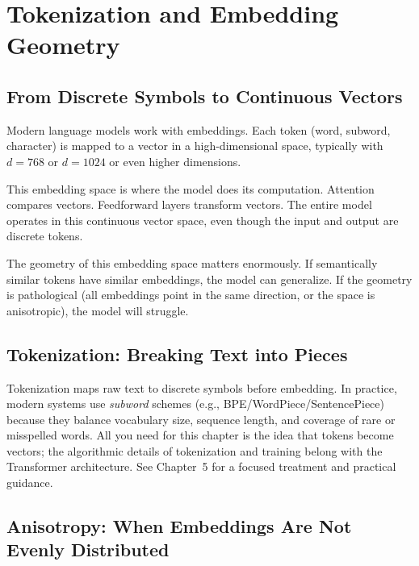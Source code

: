 \section{Tokenization and Embedding Geometry}

\subsection{From Discrete Symbols to Continuous Vectors}

Modern language models work with embeddings. Each token (word, subword, character) is mapped to a vector in a high-dimensional space, typically with $d = 768$ or $d = 1024$ or even higher dimensions.

This embedding space is where the model does its computation. Attention compares vectors. Feedforward layers transform vectors. The entire model operates in this continuous vector space, even though the input and output are discrete tokens.

\vspace{1em}

The geometry of this embedding space matters enormously. If semantically similar tokens have similar embeddings, the model can generalize. If the geometry is pathological (all embeddings point in the same direction, or the space is anisotropic), the model will struggle.

\vspace{1.5em}

\subsection{Tokenization: Breaking Text into Pieces}

Tokenization maps raw text to discrete symbols before embedding. In practice, modern systems use \emph{subword} schemes (e.g., BPE/WordPiece/SentencePiece) because they balance vocabulary size, sequence length, and coverage of rare or misspelled words. All you need for this chapter is the idea that tokens become vectors; the algorithmic details of tokenization and training belong with the Transformer architecture. See Chapter~5 for a focused treatment and practical guidance.

\vspace{1.5em}
\subsection{Anisotropy: When Embeddings Are Not Evenly Distributed}

